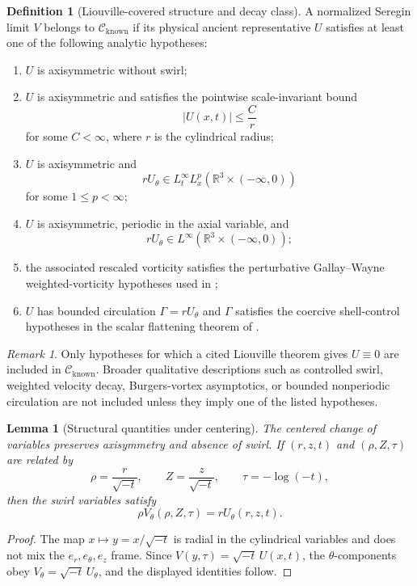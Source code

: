 \documentclass[11pt]{amsart}
\theoremstyle{plain}
\newtheorem{lemma}[theorem]{Lemma}
\theoremstyle{definition}
\newtheorem{definition}[theorem]{Definition}
\theoremstyle{remark}
\newtheorem{remark}[theorem]{Remark}
\numberwithin{equation}{section}
\newcommand{\R}{\mathbb R}
\newcommand{\calC}{\mathcal C}
\begin{document}
\begin{definition}[Liouville-covered structure and decay class]
\label{def:known-structure-decay-class}
A normalized Seregin limit \(V\) belongs to \(\calC_{\mathrm{known}}\) if its
physical ancient representative \(U\) satisfies at least one of the following
analytic hypotheses:
\begin{enumerate}[label=(\roman*)]
\item \(U\) is axisymmetric without swirl;
\item \(U\) is axisymmetric and satisfies the pointwise scale-invariant bound
\[
   |U(x,t)|\le \frac{C}{r}
\]
for some \(C<\infty\), where \(r\) is the cylindrical radius;
\item \(U\) is axisymmetric and
\[
   rU_\theta\in L_t^\infty L_x^p(\R^3\times(-\infty,0))
\]
for some \(1\le p<\infty\);
\item \(U\) is axisymmetric, periodic in the axial variable, and
\[
   rU_\theta\in L^\infty(\R^3\times(-\infty,0));
\]
\item the associated rescaled vorticity satisfies the perturbative
Gallay--Wayne weighted-vorticity hypotheses used in
\cite{DuranPaperIII};
\item \(U\) has bounded circulation \(\Gamma=rU_\theta\) and \(\Gamma\)
satisfies the coercive shell-control hypotheses in the scalar flattening
theorem of \cite{DuranPaperIII}.
\end{enumerate}
\end{definition}

\begin{remark}
Only hypotheses for which a cited Liouville theorem gives \(U\equiv0\) are
included in \(\calC_{\mathrm{known}}\).  Broader qualitative descriptions such
as controlled swirl, weighted velocity decay, Burgers-vortex asymptotics, or
bounded nonperiodic circulation are not included unless they imply one of the
listed hypotheses.
\end{remark}

\begin{lemma}[Structural quantities under centering]
\label{lem:structure-centering}
The centered change of variables preserves axisymmetry and absence of swirl.
If \((r,z,t)\) and \((\rho,Z,\tau)\) are related by
\[
   \rho=\frac r{\sqrt{-t}},\qquad Z=\frac z{\sqrt{-t}},
   \qquad \tau=-\log(-t),
\]
then the swirl variables satisfy
\[
   \rho V_\theta(\rho,Z,\tau)=rU_\theta(r,z,t).
\]
\end{lemma}

\begin{proof}
The map \(x\mapsto y=x/\sqrt{-t}\) is radial in the cylindrical variables and
does not mix the \(e_r,e_\theta,e_z\) frame.  Since
\(V(y,\tau)=\sqrt{-t}\,U(x,t)\), the \(\theta\)-components obey
\(V_\theta=\sqrt{-t}\,U_\theta\), and the displayed identities follow.
\end{proof}
\end{document}
